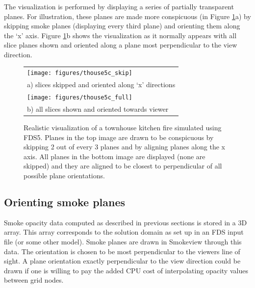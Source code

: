 The visualization is performed by displaying a series of partially
transparent planes. For illustration, these planes are made more
conspicuous (in Figure \ref{figsmoke3d}a) by skipping smoke planes
(displaying every third plane) and orienting them along the `x'
axis. Figure \ref{figsmoke3d}b shows the visualization as it
normally appears with all slice planes shown and oriented along a
plane most perpendicular to the view direction.
\begin{figure}[\figoptions]
\begin{center}
\begin{tabular}{l}
\texttt{[image: figures/thouse5c\_skip]}\\
a) slices skipped and oriented along `x' directions\\
\texttt{[image: figures/thouse5c\_full]}\\
b) all slices shown and oriented towards viewer \\
\end{tabular}
\end{center}
\caption{Realistic visualization of a townhouse kitchen fire simulated
using FDS5. Planes in the top image are drawn to be conspicuous by
skipping 2 out of every 3 planes and by aligning planes along the
x axis. All planes in the bottom image are displayed (none are
skipped) and they are aligned to be closest to perpendicular of
all possible plane orientations.
  }
\label{figsmoke3d}%
\end{figure}

%
%



%
%

\subsection{Orienting smoke planes}

Smoke opacity data computed as described in previous sections is
stored in a 3D array. This array corresponds to the solution
domain as set up in an FDS input file (or some other model). Smoke
planes are drawn in Smokeview through this data.  The orientation
is chosen to be most perpendicular to the viewers line of sight. A
plane orientation exactly perpendicular to the view direction
could be drawn if one is willing to pay the added CPU cost of
interpolating opacity values between grid nodes.


